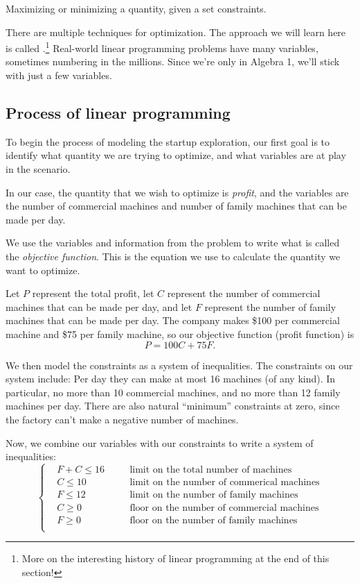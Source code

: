 \begin{boxdef}[Optimization]
Maximizing or minimizing a quantity, given a set constraints.
\end{boxdef}

There are multiple techniques for optimization. The approach we will learn here is called .\footnote{More on the interesting history of linear programming at the end of this section!} Real-world linear programming problems have many variables, sometimes numbering in the millions. Since we're only in Algebra 1, we'll stick with just a few variables.

\subsection{Process of linear programming}

To begin the process of modeling the startup exploration, our first goal is to identify what quantity we are trying to optimize, and what variables are at play in the scenario.

In our case, the quantity that we wish to optimize is \textit{profit}, and the variables are the number of commercial machines and number of family machines that can be made per day.

We use the variables and information from the problem to write what is called the \textit{objective function}. This is the equation we use to calculate the quantity we want to optimize.

Let $P$ represent the total profit, let $C$ represent the number of commercial machines that can be made per day, and let $F$ represent the number of family machines that can be made per day. The company makes \$100 per commercial machine and \$75 per family machine, so our objective function (profit function) is\[P = 100C + 75F.\]

We then model the constraints as a system of inequalities. The constraints on our system include: Per day they can make at most 16 machines (of any kind). In particular, no more than 10 commercial machines, and no more than 12 family machines per day. There are also natural ``minimum'' constraints at zero, since the factory can't make a negative number of machines.

Now, we combine our variables with our constraints to write a system of inequalities:
\[\left\{ \begin{aligned}
&F + C \leq 16	&&\quad\text{limit on the total number of machines}\\
&C \leq 10		&&\quad\text{limit on the number of commerical machines}\\
&F \leq 12		&&\quad\text{limit on the number of family machines}\\
&C \geq 0		&&\quad\text{floor on the number of commercial machines}\\
&F \geq 0		&&\quad\text{floor on the number of family machines}\\
\end{aligned}\right.\]

